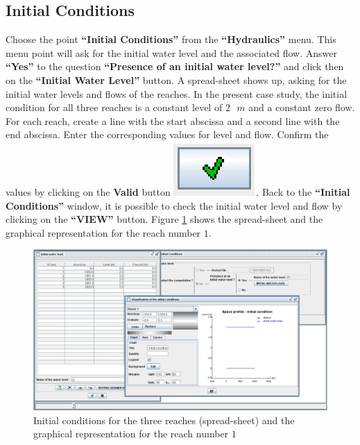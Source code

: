 \documentclass[a4paper,12pt]{article}
\begin{document}
\subsection{Initial Conditions }

\hspace{0.5cm}Choose the point \textbf{{}``Initial Conditions''} from the \textbf{{}``Hydraulics''}
menu. This menu point will ask for the initial water level and the
associated flow. Answer \textbf{{}``Yes''} to the question \textbf{{}``Presence
of an initial water level?''} and click then on the \textbf{{}``Initial
Water Level''} button. A spread-sheet shows up, asking for the initial
water levels and flows of the reaches. In the present case study,
the initial condition for all three reaches is a constant level of
$2\mbox{ }m$ and a constant zero flow. For each reach, create a line with
the start abscissa and a second line with the end abscissa. Enter
the corresponding values for level and flow. Confirm the values by
clicking on the \textbf{Valid }button \includegraphics[scale=0.6]{valid}.
Back to the \textbf{{}``Initial Conditions''} window, it is possible
to check the initial water level and flow by clicking on the \textbf{{}``VIEW''}
button. Figure \ref{fig:Initial-conditions-for} shows the spread-sheet
and the graphical representation for the reach number $1$.

\begin{figure}[h]
  \begin{center}
  \includegraphics[scale=0.3]{Cond_Ini}
  \caption{Initial conditions for the three reaches (spread-sheet) and the graphical representation for the reach number $1$}
  \label{fig:Initial-conditions-for}
  \end{center}
\end{figure}
\end{document}
